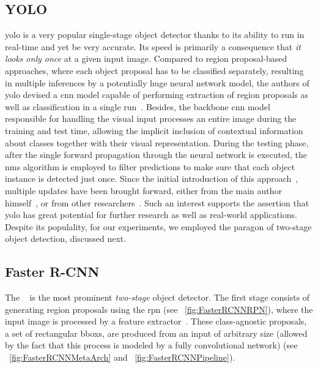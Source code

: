 \subsection{YOLO}
\label{ssec:YouLookOnlyOnce}

\Gls{yolo} is a very popular single-stage object detector thanks to its ability to run in real-time and yet be very accurate. Its speed is primarily a consequence that \emph{it looks only once} at a given input image. Compared to region proposal-based approaches, where each object proposal has to be classified separately, resulting in multiple inferences by a potentially huge neural network model, the authors of \gls{yolo} devised a \gls{cnn} model capable of performing extraction of region proposals as well as classification in a single run~\cite{redmon2016yolo}. Besides, the backbone \gls{cnn} model responsible for handling the visual input processes an entire image during the training and test time, allowing the implicit inclusion of contextual information about classes together with their visual representation. During the testing phase, after the single forward propagation through the neural network is executed, the \gls{nms} algorithm is employed to filter predictions to make sure that each object instance is detected just once. Since the initial introduction of this approach~\cite{redmon2016yolo}, multiple updates have been brought forward, either from the main author himself~\cite{redmon2017yolo9000, redmon2018yolov3}, or from other researchers~\cite{wang2020yolov4, wong2019yolonano}. Such an interest supports the assertion that \gls{yolo} has great potential for further research as well as real-world applications. Despite its populality, for our experiments, we employed the paragon of two-stage object detection, discussed next.

\subsection{Faster R-CNN}
\label{ssec:FasterRCNN}

The \fasterrcnn{}~\cite{ren2017fasterrcnn} is the most prominent \emph{two-stage} object detector. The first stage consists of generating region proposals using the \gls{rpn} (see \figtext{}~\ref{fig:FasterRCNNRPN}), where the input image is processed by a feature extractor~\cite{huang2017speedacctradeoff}. These class-agnostic proposals, a set of rectangular \glspl{bbox}, are produced from an input of arbitrary size (allowed by the fact that this process is modeled by a fully convolutional network) (see \figtext{}~\ref{fig:FasterRCNNMetaArch} and \figtext{}~\ref{fig:FasterRCNNPipeline}).

